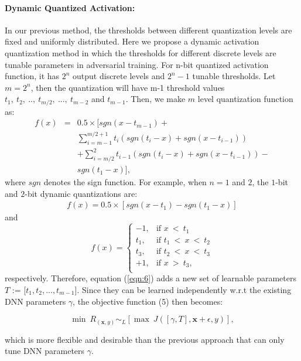 \documentclass{article}
\def \x{\mathbf{x}}
\begin{document}
\paragraph{Dynamic Quantized Activation:}
In our previous method, the thresholds between different quantization levels are fixed and uniformly distributed. Here we propose a dynamic activation quantization method in which the thresholds for different discrete levels are tunable parameters in adversarial training. 
For n-bit quantized activation function, it has $2^n$ output discrete levels and $2^n-1$ tunable thresholds. Let $m=2^n$, then the quantization will have m-1 threshold values $t_1,\ t_2,\ ..,\ t_{m/2},\ ...,\ t_{m-2}$ and $ t_{m-1}$. Then, we make $m$ level quantization function as:
\begin{eqnarray}
\label{eqn:6}
f(x)&=&0.5\times[sgn(x-t_{m-1})+ \nonumber\\
&&\sum_{i=m-1}^{m/2+1} t_i(sgn(t_i-x)+sgn(x-t_{i-1}))\nonumber\\
&&+\sum_{i=m/2}^{2} t_{i-1}(sgn(t_i-x)\nonumber
+sgn(x-t_{i-1}))-\nonumber\\
&&sgn(t_1-x)], 
\end{eqnarray}
where $sgn$ denotes the sign function. For example, when $n=1$ and $2$, the $1$-bit and $2$-bit dynamic quantizations are: 
\begin{align*}
f(x)=0.5\times[sgn(x-t_1)-sgn(t_1-x)]
\end{align*}
and
\begin{equation}{f(x)}=
\begin{cases}
    -1,& \text{if } x \ < \ t_1\\
    t_1,& \text{if } t_1\ < \ x \ < \ t_2\\
    t_3,& \text{if } t_2\ <\ x \ < \ t_3\\ 
    +1,& \text{if } x \ > \ t_3,\\ 
\end{cases}
\end{equation}
respectively. Therefore, equation (\ref{eqn:6}) adds a new set of learnable parameters $T$ := [$t_1,t_2,...,t_{m-1}$]. Since they can be learned independently w.r.t the existing DNN parameters $\gamma$, the objective function (5) then becomes:

\begin{equation}
{\min}\ R_{(\x,y)}\sim_L[\max \ J([\gamma,T],\x+\epsilon,y)],
\end{equation}

which is more flexible and desirable than the previous approach that can only tune DNN parameters $\gamma$.
\end{document}
